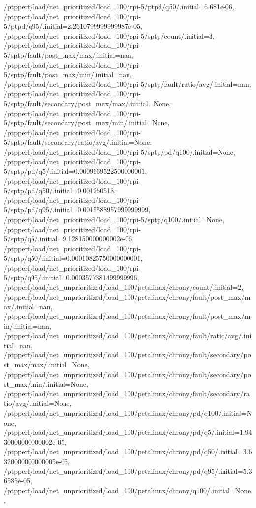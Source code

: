 {    /ptpperf/load/net_prioritized/load_100/rpi-5/ptpd/q50/.initial=6.681e-06,
    /ptpperf/load/net_prioritized/load_100/rpi-5/ptpd/q95/.initial=2.2610799999999987e-05,
    /ptpperf/load/net_prioritized/load_100/rpi-5/sptp/count/.initial=3,
    /ptpperf/load/net_prioritized/load_100/rpi-5/sptp/fault/post_max/max/.initial=nan,
    /ptpperf/load/net_prioritized/load_100/rpi-5/sptp/fault/post_max/min/.initial=nan,
    /ptpperf/load/net_prioritized/load_100/rpi-5/sptp/fault/ratio/avg/.initial=nan,
    /ptpperf/load/net_prioritized/load_100/rpi-5/sptp/fault/secondary/post_max/max/.initial=None,
    /ptpperf/load/net_prioritized/load_100/rpi-5/sptp/fault/secondary/post_max/min/.initial=None,
    /ptpperf/load/net_prioritized/load_100/rpi-5/sptp/fault/secondary/ratio/avg/.initial=None,
    /ptpperf/load/net_prioritized/load_100/rpi-5/sptp/pd/q100/.initial=None,
    /ptpperf/load/net_prioritized/load_100/rpi-5/sptp/pd/q5/.initial=0.0009669522500000001,
    /ptpperf/load/net_prioritized/load_100/rpi-5/sptp/pd/q50/.initial=0.001260513,
    /ptpperf/load/net_prioritized/load_100/rpi-5/sptp/pd/q95/.initial=0.0015588957999999999,
    /ptpperf/load/net_prioritized/load_100/rpi-5/sptp/q100/.initial=None,
    /ptpperf/load/net_prioritized/load_100/rpi-5/sptp/q5/.initial=9.128150000000002e-06,
    /ptpperf/load/net_prioritized/load_100/rpi-5/sptp/q50/.initial=0.00010825750000000001,
    /ptpperf/load/net_prioritized/load_100/rpi-5/sptp/q95/.initial=0.0003577381499999996,
    /ptpperf/load/net_unprioritized/load_100/petalinux/chrony/count/.initial=2,
    /ptpperf/load/net_unprioritized/load_100/petalinux/chrony/fault/post_max/max/.initial=nan,
    /ptpperf/load/net_unprioritized/load_100/petalinux/chrony/fault/post_max/min/.initial=nan,
    /ptpperf/load/net_unprioritized/load_100/petalinux/chrony/fault/ratio/avg/.initial=nan,
    /ptpperf/load/net_unprioritized/load_100/petalinux/chrony/fault/secondary/post_max/max/.initial=None,
    /ptpperf/load/net_unprioritized/load_100/petalinux/chrony/fault/secondary/post_max/min/.initial=None,
    /ptpperf/load/net_unprioritized/load_100/petalinux/chrony/fault/secondary/ratio/avg/.initial=None,
    /ptpperf/load/net_unprioritized/load_100/petalinux/chrony/pd/q100/.initial=None,
    /ptpperf/load/net_unprioritized/load_100/petalinux/chrony/pd/q5/.initial=1.9430000000000002e-05,
    /ptpperf/load/net_unprioritized/load_100/petalinux/chrony/pd/q50/.initial=3.6320000000000005e-05,
    /ptpperf/load/net_unprioritized/load_100/petalinux/chrony/pd/q95/.initial=5.36585e-05,
    /ptpperf/load/net_unprioritized/load_100/petalinux/chrony/q100/.initial=None,
}
